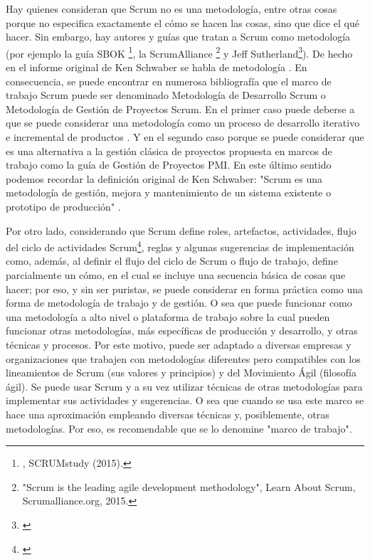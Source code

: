 Hay quienes consideran que Scrum no es una metodología, entre otras cosas porque no especifica exactamente el cómo se hacen las cosas, 
sino que dice el qué hacer. Sin embargo, hay autores y guías que tratan a Scrum como metodología (por ejemplo la guía SBOK \footnote{\cite{SBOK-2013}, SCRUMstudy (2015).}, la ScrumAlliance \footnote{"Scrum is the leading agile development methodology", Learn About Scrum, Scrumalliance.org, 2015.} y Jeff Sutherland\footnote{\cite{Jeff-Sutherland-2016}}). De hecho en el informe original de Ken Schwaber se habla de metodología \cite{Ken-Schwaber-1995}. En consecuencia, se puede encontrar en numerosa bibliografía que el marco de trabajo Scrum puede ser denominado Metodología de Desarrollo Scrum o Metodología de Gestión de Proyectos Scrum. 
En el primer caso puede deberse a que se puede considerar una metodología como un proceso de desarrollo iterativo e incremental de productos \cite{Ken-Schwaber-1995}. Y en el segundo caso porque se puede considerar que es una alternativa a la gestión clásica de proyectos propuesta en marcos de trabajo como la guía de Gestión de Proyectos PMI. En este último sentido podemos recordar la definición original de Ken Schwaber: "Scrum es una metodología de gestión, mejora y mantenimiento de un sistema existente o prototipo de producción" \cite{Ken-Schwaber-1995}.
 
Por otro lado, considerando que Scrum define roles, artefactos, actividades, flujo del ciclo de actividades Scrum\footnote{\cite{Agile-Atlas-2012}}, reglas y algunas sugerencias de implementación como, además, al definir el flujo del ciclo de Scrum o flujo de trabajo, define parcialmente un cómo, en el cual se incluye una secuencia básica de cosas que hacer; por eso, y sin ser puristas, se puede considerar en forma práctica como una forma de metodología de trabajo y de gestión. O sea que puede funcionar como una metodología a alto nivel o plataforma de trabajo sobre la cual pueden funcionar otras metodologías, más específicas de producción y desarrollo, y otras técnicas y procesos. Por este motivo, puede ser adaptado a diversas empresas y organizaciones que trabajen con metodologías diferentes pero compatibles con los lineamientos de Scrum (sus valores y principios) y del Movimiento Ágil (filosofía ágil). Se puede usar Scrum y a su vez utilizar técnicas de otras metodologías para implementar sus actividades y sugerencias. O sea que cuando se usa este marco se hace una aproximación empleando diversas técnicas y, posiblemente, otras metodologías. Por eso, es recomendable que se lo denomine "marco de trabajo".

